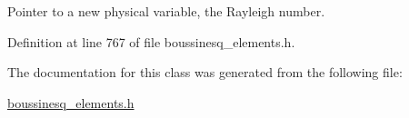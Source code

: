 Pointer to a new physical variable, the Rayleigh number. 



Definition at line 767 of file boussinesq\+\_\+elements.\+h.



The documentation for this class was generated from the following file\+:\begin{DoxyCompactItemize}
\item 
\hyperlink{boussinesq__elements_8h}{boussinesq\+\_\+elements.\+h}\end{DoxyCompactItemize}
